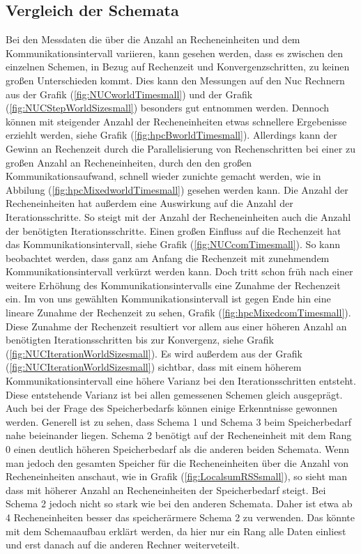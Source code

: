 \subsection{Vergleich der Schemata}
Bei den Messdaten die \"uber die Anzahl an Recheneinheiten und dem Kommunikationsintervall variieren, kann gesehen werden, dass es zwischen den einzelnen Schemen, in Bezug auf Rechenzeit und Konvergenzschritten, zu keinen gro\ss{}en Unterschieden kommt. Dies kann den Messungen auf den Nuc Rechnern aus der Grafik (\ref{fig:NUCworldTimesmall}) und der Grafik (\ref{fig:NUCStepWorldSizesmall}) besonders gut entnommen werden. Dennoch k\"onnen mit steigender Anzahl der Recheneinheiten  etwas schnellere Ergebenisse erziehlt werden, siehe Grafik (\ref{fig:hpcBworldTimesmall}). Allerdings kann der Gewinn an Rechenzeit durch die Parallelisierung von Rechenschritten bei einer zu gro\ss{}en Anzahl an Recheneinheiten, durch den den gro\ss{}en Kommunikationsaufwand, schnell wieder zunichte gemacht werden, wie in Abbilung (\ref{fig:hpcMixedworldTimesmall}) gesehen werden kann. Die Anzahl der Recheneinheiten hat au\ss{}erdem eine Auswirkung auf die Anzahl der Iterationsschritte. So steigt mit der Anzahl der Recheneinheiten auch die Anzahl der ben\"otigten Iterationsschritte. Einen gro\ss{}en Einfluss auf die Rechenzeit hat das Kommunikationsintervall, siehe  Grafik (\ref{fig:NUCcomTimesmall}). So kann beobachtet werden, dass ganz am Anfang die Rechenzeit mit zunehmendem Kommunikationsintervall verk\"urzt werden kann. Doch tritt schon fr\"uh nach einer weitere Erh\"ohung des Kommunikationsintervalls eine Zunahme der Rechenzeit ein. Im von uns gew\"ahlten Kommunikationsintervall ist gegen Ende hin eine lineare Zunahme der Rechenzeit zu sehen, Grafik (\ref{fig:hpcMixedcomTimesmall}). Diese Zunahme der Rechenzeit resultiert vor allem aus einer h\"oheren Anzahl an ben\"otigten Iterationsschritten bis zur Konvergenz, siehe Grafik (\ref{fig:NUCIterationWorldSizesmall}). Es wird au\ss{}erdem aus der Grafik (\ref{fig:NUCIterationWorldSizesmall}) sichtbar, dass mit einem h\"oherem Kommunikationsintervall eine h\"ohere Varianz bei den Iterationsschritten entsteht. Diese entstehende Varianz ist bei allen gemessenen Schemen gleich ausgepr\"agt.\\ Auch bei der Frage des Speicherbedarfs k\"onnen einige Erkenntnisse gewonnen werden. Generell ist zu sehen, dass Schema 1 und Schema 3 beim Speicherbedarf nahe beieinander liegen. Schema 2 ben\"otigt auf der Recheneinheit mit dem Rang 0 einen deutlich h\"oheren Speicherbedarf als die anderen beiden Schemata. Wenn man jedoch den gesamten Speicher f\"ur die Recheneinheiten \"uber die Anzahl von Recheneinheiten anschaut, wie in Grafik (\ref{fig:LocalsumRSSsmall}), so sieht man dass mit h\"oherer Anzahl an Recheneinheiten der Speicherbedarf steigt. Bei Schema 2 jedoch nicht so stark wie bei den anderen Schemata. Daher ist etwa ab 4 Recheneinheiten besser das speicherärmere Schema 2 zu verwenden. Das k\"onnte mit dem Schemaaufbau erkl\"art werden, da hier nur ein Rang alle Daten einliest und erst danach auf die anderen Rechner weiterveteilt.\\
